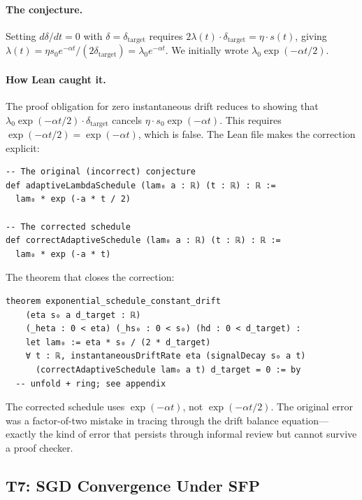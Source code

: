 \documentclass[11pt,a4paper]{article}
\theoremstyle{definition}
\begin{document}
\paragraph{The conjecture.} Setting $d\delta/dt = 0$ with $\delta = \delta_{\mathrm{target}}$ requires $2\lambda(t) \cdot \delta_{\mathrm{target}} = \eta \cdot s(t)$, giving $\lambda(t) = \eta s_0 e^{-\alpha t} / (2\delta_{\mathrm{target}}) = \lambda_0 e^{-\alpha t}$. We initially wrote $\lambda_0 \exp(-\alpha t / 2)$.

\paragraph{How Lean caught it.} The proof obligation for zero instantaneous drift reduces to showing that $\lambda_0 \exp(-\alpha t / 2) \cdot \delta_{\mathrm{target}}$ cancels $\eta \cdot s_0 \exp(-\alpha t)$. This requires $\exp(-\alpha t / 2) = \exp(-\alpha t)$, which is false. The Lean file makes the correction explicit:

\begin{lstlisting}[style=lean]
-- The original (incorrect) conjecture
def adaptiveLambdaSchedule (lam₀ a : ℝ) (t : ℝ) : ℝ :=
  lam₀ * exp (-a * t / 2)

-- The corrected schedule
def correctAdaptiveSchedule (lam₀ a : ℝ) (t : ℝ) : ℝ :=
  lam₀ * exp (-a * t)
\end{lstlisting}

The theorem that closes the correction:
\begin{lstlisting}[style=lean]
theorem exponential_schedule_constant_drift
    (eta s₀ a d_target : ℝ)
    (_heta : 0 < eta) (_hs₀ : 0 < s₀) (hd : 0 < d_target) :
    let lam₀ := eta * s₀ / (2 * d_target)
    ∀ t : ℝ, instantaneousDriftRate eta (signalDecay s₀ a t)
      (correctAdaptiveSchedule lam₀ a t) d_target = 0 := by
  -- unfold + ring; see appendix
\end{lstlisting}

The corrected schedule uses $\exp(-\alpha t)$, not $\exp(-\alpha t/2)$. The original error was a factor-of-two mistake in tracing through the drift balance equation---exactly the kind of error that persists through informal review but cannot survive a proof checker.

\subsection{T7: SGD Convergence Under SFP}
\end{document}
